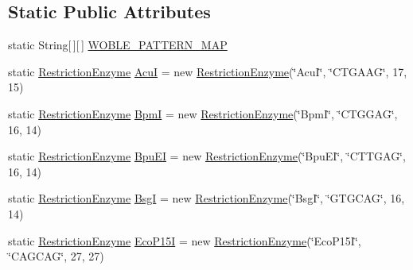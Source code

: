\subsection*{Static Public Attributes}
\begin{DoxyCompactItemize}
\item 
static String\mbox{[}$\,$\mbox{]}\mbox{[}$\,$\mbox{]} \hyperlink{classbroad_1_1core_1_1primer3_1_1_restriction_enzyme_a14f30a2457ab294a1e543c6a9ec09c46}{W\+O\+B\+L\+E\+\_\+\+P\+A\+T\+T\+E\+R\+N\+\_\+\+M\+A\+P}
\item 
static \hyperlink{classbroad_1_1core_1_1primer3_1_1_restriction_enzyme}{Restriction\+Enzyme} \hyperlink{classbroad_1_1core_1_1primer3_1_1_restriction_enzyme_ac7c9050a35a3752d72d108271e753a55}{Acu\+I} = new \hyperlink{classbroad_1_1core_1_1primer3_1_1_restriction_enzyme}{Restriction\+Enzyme}(\char`\"{}Acu\+I\char`\"{}, \char`\"{}C\+T\+G\+A\+A\+G\char`\"{}, 17, 15)
\item 
static \hyperlink{classbroad_1_1core_1_1primer3_1_1_restriction_enzyme}{Restriction\+Enzyme} \hyperlink{classbroad_1_1core_1_1primer3_1_1_restriction_enzyme_a36a48525909e85f73a7e8596141f9e5f}{Bpm\+I} = new \hyperlink{classbroad_1_1core_1_1primer3_1_1_restriction_enzyme}{Restriction\+Enzyme}(\char`\"{}Bpm\+I\char`\"{}, \char`\"{}C\+T\+G\+G\+A\+G\char`\"{}, 16, 14)
\item 
static \hyperlink{classbroad_1_1core_1_1primer3_1_1_restriction_enzyme}{Restriction\+Enzyme} \hyperlink{classbroad_1_1core_1_1primer3_1_1_restriction_enzyme_acbcb87d8fe80e472f11872e71ed8e561}{Bpu\+E\+I} = new \hyperlink{classbroad_1_1core_1_1primer3_1_1_restriction_enzyme}{Restriction\+Enzyme}(\char`\"{}Bpu\+E\+I\char`\"{}, \char`\"{}C\+T\+T\+G\+A\+G\char`\"{}, 16, 14)
\item 
static \hyperlink{classbroad_1_1core_1_1primer3_1_1_restriction_enzyme}{Restriction\+Enzyme} \hyperlink{classbroad_1_1core_1_1primer3_1_1_restriction_enzyme_abec47409dc2980c407344ace3efe145c}{Bsg\+I} = new \hyperlink{classbroad_1_1core_1_1primer3_1_1_restriction_enzyme}{Restriction\+Enzyme}(\char`\"{}Bsg\+I\char`\"{}, \char`\"{}G\+T\+G\+C\+A\+G\char`\"{}, 16, 14)
\item 
static \hyperlink{classbroad_1_1core_1_1primer3_1_1_restriction_enzyme}{Restriction\+Enzyme} \hyperlink{classbroad_1_1core_1_1primer3_1_1_restriction_enzyme_a13b0e6fea8a6aa1867852b2be2bb570d}{Eco\+P15\+I} = new \hyperlink{classbroad_1_1core_1_1primer3_1_1_restriction_enzyme}{Restriction\+Enzyme}(\char`\"{}Eco\+P15\+I\char`\"{}, \char`\"{}C\+A\+G\+C\+A\+G\char`\"{}, 27, 27)

\end{DoxyCompactItemize}
